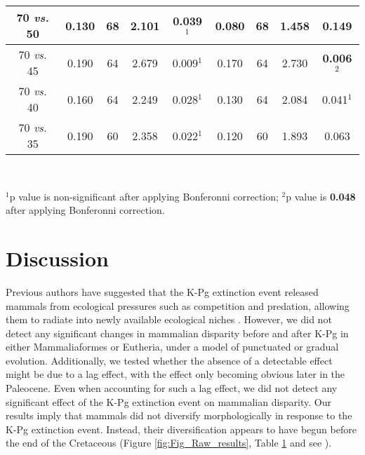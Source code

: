 \documentclass[10pt,letterpaper]{article}
\begin{document}
\begin{table}[!ht]
\begin{adjustwidth}{-2.25in}{0in}
\begin{tabular}{|c|c|c|c|c|c|c|c|c|}
  70 \textit{vs.} 50 & 0.130 & 68 & 2.101 & 0.039$^1$ & 0.080 & 68 & 1.458 & 0.149 \\ \hline
  70 \textit{vs.} 45 & 0.190 & 64 & 2.679 & 0.009$^1$ & 0.170 & 64 & 2.730 & \textbf{0.006}$^2$ \\ \hline
  70 \textit{vs.} 40 & 0.160 & 64 & 2.249 & 0.028$^1$ & 0.130 & 64 & 2.084 & 0.041$^1$ \\ \hline
  70 \textit{vs.} 35 & 0.190 & 60 & 2.358 & 0.022$^1$ & 0.120 & 60 & 1.893 & 0.063 \\ \hline
   \hline
\end{tabular} \\
\begin{flushleft} $^1$p value is non-significant after applying Bonferonni correction; $^2$p value is \textbf{0.048} after applying Bonferonni correction.
\end{flushleft}
\label{tab:Tab_results}
\end{adjustwidth}
\end{table}


\section*{Discussion}
Previous authors have suggested that the K-Pg extinction event released mammals from ecological pressures such as competition and predation, allowing them to radiate into newly available ecological niches \cite{archibald2011extinction,OLeary08022013,Lovergrove,Slater2012MEE}.
However, we did not detect any significant changes in mammalian disparity before and after K-Pg in either Mammaliaformes or Eutheria, under a model of punctuated or gradual evolution.
Additionally, we tested whether the absence of a detectable effect might be due to a lag effect, with the effect only becoming obvious later in the Paleocene.
Even when accounting for such a lag effect, we did not detect any significant effect of the K-Pg extinction event on mammalian disparity.
Our results imply that mammals did not diversify morphologically in response to the K-Pg extinction event.
Instead, their diversification appears to have begun before the end of the Cretaceous (Figure \ref{fig:Fig_Raw_results}, Table \ref{tab:Tab_results} and see \cite{meredithimpacts2011,dosReis2014,Close2015,Lee2015R759}).
\end{document}

